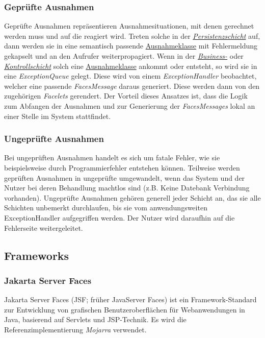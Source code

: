 \subsubsection{Geprüfte Ausnahmen}
Geprüfte Ausnahmen repräsentieren Ausnahmesituationen, mit
denen gerechnet werden muss und auf die reagiert wird.
Treten solche in der \emph{\hyperref[arch:persistence]{Persistenzschicht}}
auf, dann werden sie in eine semantisch passende \hyperref[arch:busex]{Ausnahmeklasse}
mit Fehlermeldung gekapselt und an den Aufrufer weiterpropagiert.
Wenn in der \emph{\hyperref[arch:bus]{Business-}} oder
\emph{\hyperref[arch:control]{Kontrollschicht}} solch eine
\hyperref[arch:busex]{Ausnahmeklasse} ankommt oder entsteht, so
wird sie in eine \emph{ExceptionQueue} %
gelegt. Diese wird von einem \emph{ExceptionHandler} beobachtet, welcher eine passende
\emph{FacesMessage} daraus generiert.
Diese werden dann von den zugehörigen \emph{Facelets} %
gerendert.
Der Vorteil dieses Ansatzes ist, dass die Logik
zum Abfangen der Ausnahmen und zur Generierung der
\emph{FacesMessages} lokal an einer Stelle im System stattfindet.

\subsubsection{Ungeprüfte Ausnahmen}
Bei ungeprüften Ausnahmen handelt es sich um fatale Fehler, wie sie beispielsweise durch
Programmierfehler entstehen können. Teilweise werden geprüften Ausnahmen
in ungeprüfte umgewandelt, wenn das System und der Nutzer bei deren Behandlung
machtlos sind (z.B. Keine Datebank Verbindung vorhanden). %
Ungeprüfte Ausnahmen gehören generell jeder Schicht an, das sie alle Schichten unbemerkt durchlaufen,
bis sie vom anwendungsweiten
ExceptionHandler %
aufgegriffen werden. Der Nutzer wird daraufhin auf die Fehlerseite %
weitergeleitet.

\subsection{Frameworks}\label{arch:frameworks}

\subsubsection{Jakarta Server Faces}
Jakarta Server Faces (JSF; früher JavaServer Faces) ist ein Framework-Standard zur
Entwicklung von grafischen Benutzeroberflächen für Webanwendungen in Java, basierend auf Servlets und JSP-Technik.
Es wird die Referenzimplementierung \emph{Mojarra} verwendet.

